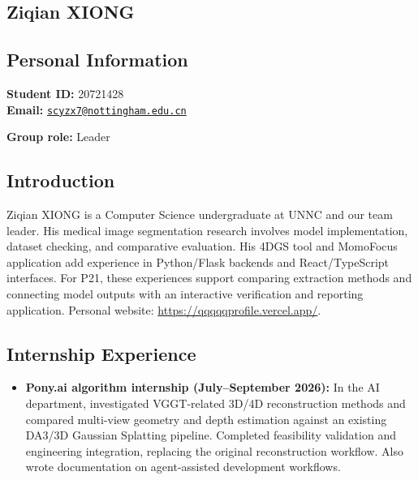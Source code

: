 \documentclass[a4paper,12pt]{article}
\newcommand{\PersonalInformation}[2]{%
  \subsection*{Personal Information}
  \if\relax\detokenize{#1}\relax\else
  \noindent\textbf{Student ID:} #1\\
  \fi
  \textbf{Email:} #2\par
}
\begin{document}
\subsection{Ziqian XIONG}
\PersonalInformation{20721428}{\href{mailto:scyzx7@nottingham.edu.cn}{\nolinkurl{scyzx7@nottingham.edu.cn}}}
\noindent\textbf{Group role:} Leader\par

\subsection*{Introduction}
Ziqian XIONG is a Computer Science undergraduate at UNNC and our team leader. His medical image segmentation research involves model implementation, dataset checking, and comparative evaluation. His 4DGS tool and MomoFocus application add experience in Python/Flask backends and React/TypeScript interfaces. For P21, these experiences support comparing extraction methods and connecting model outputs with an interactive verification and reporting application. Personal website: \url{https://qqqqqprofile.vercel.app/}.

\subsection*{Internship Experience}
\begin{itemize}
  \item \textbf{Pony.ai algorithm internship (July--September 2026):} In the AI department, investigated VGGT-related 3D/4D reconstruction methods and compared multi-view geometry and depth estimation against an existing DA3/3D Gaussian Splatting pipeline. Completed feasibility validation and engineering integration, replacing the original reconstruction workflow. Also wrote documentation on agent-assisted development workflows.
\end{itemize}
\end{document}

